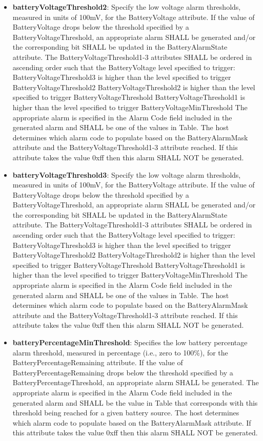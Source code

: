 \begin{itemize}
\item \textbf{batteryVoltageThreshold2}: Specify the low voltage alarm thresholds, measured in units of 100mV, for the BatteryVoltage attribute. If the value of BatteryVoltage drops below the threshold specified by a BatteryVoltageThreshold, an appropriate alarm SHALL be generated and/or the corresponding bit SHALL be updated in the BatteryAlarmState attribute. The BatteryVoltageThreshold1-3 attributes SHALL be ordered in ascending order such that the BatteryVoltage level specified to trigger: BatteryVoltageThreshold3 is higher than the level specified to trigger BatteryVoltageThreshold2 BatteryVoltageThreshold2 is higher than the level specified to trigger BatteryVoltageThreshold BatteryVoltageThreshold1 is higher than the level specified to trigger BatteryVoltageMinThreshold The appropriate alarm is specified in the Alarm Code field included in the generated alarm and SHALL be one of the values in Table. The host determines which alarm code to populate based on the BatteryAlarmMask attribute and the BatteryVoltageThreshold1-3 attribute reached. If this attribute takes the value 0xff then this alarm SHALL NOT be generated.
\item \textbf{batteryVoltageThreshold3}: Specify the low voltage alarm thresholds, measured in units of 100mV, for the BatteryVoltage attribute. If the value of BatteryVoltage drops below the threshold specified by a BatteryVoltageThreshold, an appropriate alarm SHALL be generated and/or the corresponding bit SHALL be updated in the BatteryAlarmState attribute. The BatteryVoltageThreshold1-3 attributes SHALL be ordered in ascending order such that the BatteryVoltage level specified to trigger: BatteryVoltageThreshold3 is higher than the level specified to trigger BatteryVoltageThreshold2 BatteryVoltageThreshold2 is higher than the level specified to trigger BatteryVoltageThreshold BatteryVoltageThreshold1 is higher than the level specified to trigger BatteryVoltageMinThreshold The appropriate alarm is specified in the Alarm Code field included in the generated alarm and SHALL be one of the values in Table. The host determines which alarm code to populate based on the BatteryAlarmMask attribute and the BatteryVoltageThreshold1-3 attribute reached. If this attribute takes the value 0xff then this alarm SHALL NOT be generated.
\item \textbf{batteryPercentageMinThreshold}: Specifies the low battery percentage alarm threshold, measured in percentage (i.e., zero to 100\%), for the BatteryPercentageRemaining attribute. If the value of BatteryPercentageRemaining drops below the threshold specified by a BatteryPercentageThreshold, an appropriate alarm SHALL be generated. The appropriate alarm is specified in the Alarm Code field included in the generated alarm and SHALL be the value in Table that corresponds with this threshold being reached for a given battery source. The host determines which alarm code to populate based on the BatteryAlarmMask attribute. If this attribute takes the value 0xff then this alarm SHALL NOT be generated.

\end{itemize}
